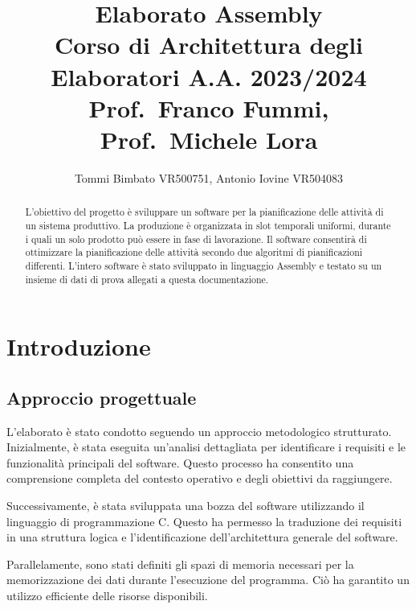 \documentclass[a4paper]{report}
\author{Tommi Bimbato VR500751, Antonio Iovine VR504083}
\title{Elaborato Assembly \\ \normalsize Corso di Architettura degli Elaboratori A.A. 2023/2024 \\ Prof.\ Franco Fummi, Prof.\ Michele Lora}
\begin{document}
\begin{titlepage}
    \maketitle
\end{titlepage}

\thispagestyle{empty} %

\tableofcontents %

\begin{abstract}

  L'obiettivo del progetto è sviluppare un software per la pianificazione delle attività di un sistema produttivo.
  La produzione è organizzata in slot temporali uniformi, durante i quali un solo prodotto può essere in fase di lavorazione. 
  Il software consentirà di ottimizzare la pianificazione delle attività secondo due algoritmi di pianificazioni differenti.
  L'intero software è stato sviluppato in linguaggio Assembly e testato su un insieme di dati di prova allegati a questa documentazione.

\end{abstract}

\chapter{Introduzione}
\section{Approccio progettuale}
L'elaborato è stato condotto seguendo un approccio metodologico strutturato.
Inizialmente, è stata eseguita un'analisi dettagliata per identificare i requisiti
e le funzionalità principali del software. Questo processo ha consentito
una comprensione completa del contesto operativo e degli obiettivi da raggiungere.

Successivamente, è stata sviluppata una bozza del software utilizzando il linguaggio
di programmazione C. Questo ha permesso la traduzione dei requisiti in
una struttura logica e l'identificazione dell'architettura generale del software.

Parallelamente, sono stati definiti gli spazi di memoria necessari
per la memorizzazione dei dati durante l'esecuzione del programma.
Ciò ha garantito un utilizzo efficiente delle risorse disponibili.
\end{document}
